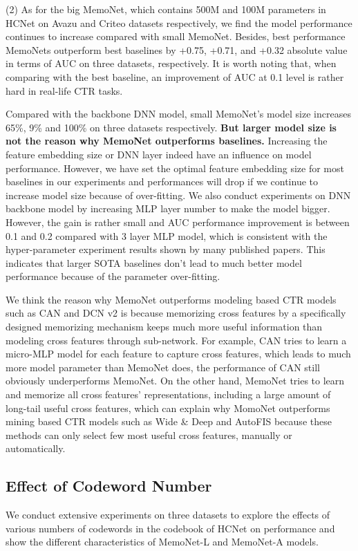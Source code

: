 \documentclass[sigconf,authorversion]{acmart}
\begin{document}
(2) As for the big MemoNet, which contains 500M and 100M parameters in HCNet on Avazu and Criteo datasets respectively, we find the model performance continues to increase compared with small MemoNet. Besides, best performance MemoNets outperform best baselines by +0.75, +0.71, and +0.32 absolute value in terms of AUC on three datasets, respectively. It is worth noting that, when comparing with the best baseline, an improvement of AUC at 0.1 level is rather hard in real-life CTR tasks. 

Compared with the backbone DNN model, small MemoNet's model size increases 65\%, 9\% and 100\% on three datasets respectively. \textbf{But larger model size is not the reason why MemoNet outperforms baselines.} Increasing the feature embedding size or DNN layer indeed have an influence on model performance. However, we have set the optimal feature embedding size for most baselines in our experiments and performances will drop if we continue to increase model size because of over-fitting.  We also conduct experiments on DNN backbone model by increasing MLP layer number to make the model bigger. However, the gain is rather small and AUC performance improvement is between 0.1 and 0.2 compared with 3 layer MLP model, which is consistent with the hyper-parameter experiment results shown by many published papers\cite{guo2017deepfm}\cite{HuangZZ19}\cite{lian2018xdeepfm}. This indicates that larger SOTA baselines don't lead to much better model performance because of the parameter over-fitting.

We think the reason why MemoNet outperforms modeling based CTR models such as CAN and DCN v2 is because memorizing cross features by a specifically designed  memorizing mechanism keeps much more useful information than modeling cross features through sub-network. For example, CAN tries to learn a micro-MLP model for each feature to capture cross features, which leads to much more model parameter than MemoNet does, the performance of CAN still obviously underperforms MemoNet. On the other hand, MemoNet tries to learn and memorize all cross features' representations, including a large amount of long-tail useful cross features, which can explain why MomoNet outperforms mining based CTR models such as Wide \& Deep and AutoFIS because these methods can only select few most useful cross features, manually or automatically.
\subsection{Effect of Codeword Number}
We conduct extensive experiments on three datasets to explore the effects of various numbers of codewords in the codebook of HCNet on performance and show the different characteristics of MemoNet-L and MemoNet-A models.
\end{document}
